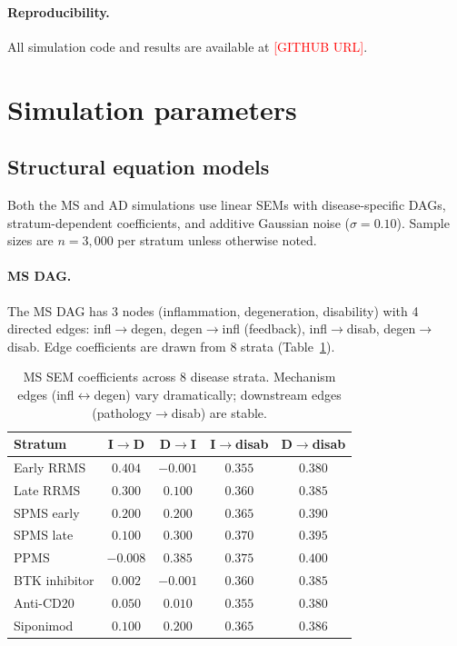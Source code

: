 \documentclass{article}
\begin{document}
\paragraph{Reproducibility.}
All simulation code and results are available at \textcolor{red}{[GITHUB URL]}.




\appendix

\section{Simulation parameters}
\label{app:sim-params}

\subsection{Structural equation models}

Both the MS and AD simulations use linear SEMs with disease-specific DAGs, stratum-dependent coefficients, and additive Gaussian noise ($\sigma = 0.10$). Sample sizes are $n = 3{,}000$ per stratum unless otherwise noted.

\paragraph{MS DAG.}
The MS DAG has 3 nodes (inflammation, degeneration, disability) with 4 directed edges: infl$\to$degen, degen$\to$infl (feedback), infl$\to$disab, degen$\to$disab. Edge coefficients are drawn from 8 strata (Table~\ref{tab:ms-sem}).

\begin{table}[h]
\centering
\caption{MS SEM coefficients across 8 disease strata. Mechanism edges (infl$\leftrightarrow$degen) vary dramatically; downstream edges (pathology$\to$disab) are stable.}
\label{tab:ms-sem}
\small
\begin{tabular}{@{}lcccc@{}}
\toprule
\textbf{Stratum} & \textbf{I$\to$D} & \textbf{D$\to$I} & \textbf{I$\to$disab} & \textbf{D$\to$disab} \\
\midrule
Early RRMS & $0.404$ & $-0.001$ & $0.355$ & $0.380$ \\
Late RRMS & $0.300$ & $0.100$ & $0.360$ & $0.385$ \\
SPMS early & $0.200$ & $0.200$ & $0.365$ & $0.390$ \\
SPMS late & $0.100$ & $0.300$ & $0.370$ & $0.395$ \\
PPMS & $-0.008$ & $0.385$ & $0.375$ & $0.400$ \\
BTK inhibitor & $0.002$ & $-0.001$ & $0.360$ & $0.385$ \\
Anti-CD20 & $0.050$ & $0.010$ & $0.355$ & $0.380$ \\
Siponimod & $0.100$ & $0.200$ & $0.365$ & $0.386$ \\
\bottomrule
\end{tabular}
\end{table}
\end{document}

